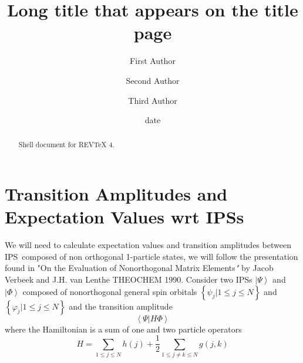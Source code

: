 \documentclass[aps,preprint]{revtex4}%
\begin{document}
\title[Short title for running header]{Long title that appears on the title page}
\author{First Author}
\author{Second Author}
\author{Third Author}

\begin{abstract}
Shell document for REV\TeX{} 4.

\end{abstract}
\date[Date text]{date}




\maketitle
\tableofcontents


\section{Transition Amplitudes and Expectation Values wrt IPSs}

We will need to calculate expectation values and transition amplitudes between
IPS\ composed of non orthogonal 1-particle states, we will follow the
presentation found in "On the Evaluation of Nonorthogonal Matrix
Elements\textit{" }by Jacob Verbeek and J.H. van Lenthe THEOCHEM 1990.
Consider two IPSs $\left\vert \Psi\right\rangle $ and $\left\vert
\Phi\right\rangle $ composed of nonorthogonal general spin orbitals $\left\{
\psi_{j}|1\leq j\leq N\right\}  $ and $\left\{  \varphi_{j}|1\leq j\leq
N\right\}  $ and the transition amplitude
\begin{equation}
\left\langle \Psi|H\Phi\right\rangle
\end{equation}
where the Hamiltonian is a sum of one and two particle operators
\begin{equation}
H=%
{\displaystyle\sum\limits_{1\leq j\leq N}}
h\left(  j\right)  +\frac{1}{2}%
{\displaystyle\sum\limits_{1\leq j\neq k\leq N}}
g\left(  j,k\right)
\end{equation}
\end{document}
